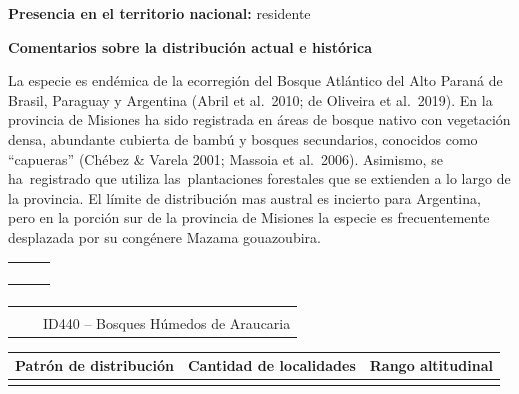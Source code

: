 \documentclass[
  x11names]{article}
\begin{document}
\vspace{-0.4cm}

\textbf{Presencia en el territorio nacional:} residente

\textbf{Comentarios sobre la distribución actual e histórica}

La especie es endémica de la ecorregión del Bosque Atlántico del Alto
Paraná de Brasil, Paraguay y Argentina (Abril et al.~2010; de Oliveira
et al.~2019). En la provincia de Misiones ha sido registrada en áreas de
bosque nativo con vegetación densa, abundante cubierta de bambú y
bosques secundarios, conocidos como ``capueras'' (Chébez \& Varela 2001;
Massoia et al.~2006). Asimismo, se ha~registrado que utiliza
las~plantaciones forestales que se extienden a lo largo de la provincia.
El límite de distribución mas austral es incierto para Argentina, pero
en la porción sur de la provincia de Misiones la especie es
frecuentemente desplazada por su congénere Mazama gouazoubira.~

\begin{tabu} to 
\toprule
\textbf{} &  & \\
\bottomrule
\end{tabu}

\begin{tabu} to 
\toprule
\textbf{} &  & \\
\bottomrule
\end{tabu}

\begin{tabu} to 
\toprule
\textbf{} &  & \\
\textbf{} &  & ID440 – Bosques Húmedos de Araucaria\\
\bottomrule
\end{tabu}

\begin{tabu} to 
\toprule
\textbf{Patrón de distribución} & \textbf{Cantidad de localidades} & \textbf{Rango altitudinal}\\
\midrule
{} &  & \\
\bottomrule
\end{tabu}
\end{document}
